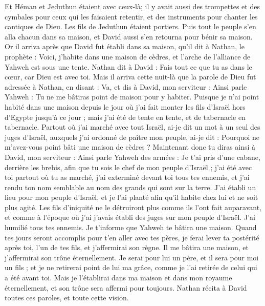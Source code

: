 \begin{multicols}{2}
Et Héman et Jeduthun étaient avec ceux-là; il y avait aussi des trompettes et des cymbales pour ceux qui les faisaient retentir, et des instruments pour chanter les cantiques de Dieu. Les fils de Jeduthun étaient portiers.
Puis tout le peuple s'en alla chacun dans sa maison, et David aussi s'en retourna pour bénir sa maison.
\VerseOne{}Or il arriva après que David fut établi dans sa maison, qu'il dit à Nathan, le prophète : Voici,  j’habite dans une maison de cèdres, et l’arche de l'alliance de Yahweh est sous une tente.
Nathan dit à David : Fais tout ce que tu as dans le cœur, car Dieu est avec toi.
Mais il arriva cette nuit-là que la parole de Dieu fut adressée à Nathan, en disant :
Va, et dis à David, mon serviteur : Ainsi parle Yahweh :  Tu ne me bâtiras point de maison pour y habiter.
Puisque je n'ai point habité dans une maison depuis le jour où j'ai fait monter les fils d’Israël hors d'Egypte jusqu'à ce jour ; mais j'ai été de tente en tente, et de tabernacle en tabernacle.
Partout où j’ai marché avec tout Israël, ai-je dit un mot à un seul des juges d'Israël, auxquels j'ai ordonné de paître mon peuple, ai-je dit : Pourquoi ne m'avez-vous point bâti une maison de cèdres ?
Maintenant donc tu diras ainsi à David, mon serviteur : Ainsi parle Yahweh des armées : Je t'ai pris d'une cabane, derrière les brebis, afin que tu sois le chef de mon peuple d'Israël ;
j'ai été avec toi partout où tu as marché, j'ai exterminé devant toi tous tes ennemis, et j’ai rendu ton nom semblable au nom des grands qui sont sur la terre.
J’ai établi un lieu pour mon peuple d'Israël, et je l’ai planté afin qu’il habite chez lui et ne soit plus agité.  Les fils d'iniquité ne le détruiront plus comme ils l’ont fait auparavant,
et comme à l’époque où j'ai j’avais établi des juges sur mon peuple d'Israël. J’ai humilié tous tes ennemis. Je t’informe que Yahweh te bâtira une maison.
Quand tes jours seront accomplis pour t'en aller avec tes pères, je ferai lever ta postérité après toi, l’un de tes fils, et j'affermirai son règne.
Il me bâtira une maison, et j'affermirai son trône éternellement.
Je serai pour lui un père, et il sera pour moi un fils ; et je ne retirerai point de lui ma grâce, comme je l'ai retirée de celui qui a été avant toi.
Mais je l'établirai dans ma maison et dans mon royaume éternellement, et son trône sera affermi pour toujours.
Nathan récita à David toutes ces paroles, et toute cette vision.

\end{multicols}
